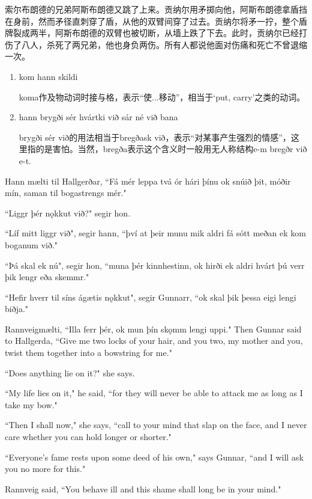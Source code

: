 \begin{translation*}{}
  索尔布朗德的兄弟阿斯布朗德又跳了上来。贡纳尔用矛掷向他，阿斯布朗德拿盾挡在身前，然而矛径直刺穿了盾，从他的双臂间穿了过去。贡纳尔将矛一拧，整个盾牌裂成两半，阿斯布朗德的双臂也被切断，从墙上跌了下去。此时，贡纳尔已经打伤了八人，杀死了两兄弟，他也身负两伤。所有人都说他面对伤痛和死亡不曾退缩一次。
\end{translation*}
\begin{grammar*}{}
  \begin{enumerate}[leftmargin=*]
    \item kom hann skildi

          koma作及物动词时接与格，表示“使...移动”，相当于`put, carry'之类的动词。
    \item hann brygði sér hvártki við sár né við bana

          brygði sér við的用法相当于bregðask við，表示“对某事产生强烈的情感”，这里指的是害怕。当然，bregða表示这个含义时一般用无人称结构e-m bregðr við e-t.
  \end{enumerate}
\end{grammar*}
\begin{paracol}{2}
  Hann mælti til Hallgerðar, ``Fá mér leppa tvá ór hári þínu ok snúið þit, móðir mín, saman til bogastrengs mér."

  ``Liggr þér nǫkkut við?" segir hon.

  ``Líf mitt liggr við", segir hann, ``því at þeir munu mik aldri fá sótt meðan ek kom boganum við."

  ``Þá skal ek nú", segir hon, ``muna þér kinnhestinn, ok hirði ek aldri hvárt þú verr þik lengr eða skemmr."

  ``Hefir hverr til síns ágætis nǫkkut", segir Gunnarr, ``ok skal þik þessa eigi lengi biðja."

  Rannveig\footnotemark mælti, ``Illa ferr þér, ok mun þín skǫmm lengi uppi."
  \switchcolumn
  Then Gunnar said to Hallgerda, ``Give me two locks of your hair, and you two, my mother and you, twist them together into a bowstring for me."

  ``Does anything lie on it?" she says.

  ``My life lies on it," he said, ``for they will never be able to attack me as long as I take my bow."

  ``Then I shall now," she says, ``call to your mind that slap on the face, and I never care whether you can hold longer or shorter."

  ``Everyone's fame rests upon some deed of his own," says Gunnar, ``and I will ask you no more for this."

  Rannveig said, ``You behave ill and this shame shall long be in your mind."
\end{paracol}

